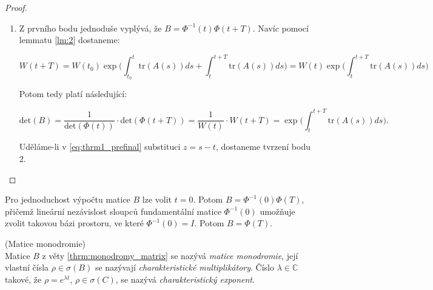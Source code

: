 \begin{thrm}
\begin{proof}
\begin{enumerate}
			\item Z prvního bodu jednoduše vyplývá, že $B = \Phi^{-1}(t) \Phi(t+T)$. Navíc pomocí lemmatu \ref{lm:2} dostaneme:
			
			\begin{equation}
				W(t+T) = W(t_{0}) \exp \Big( \int_{t_{0}}^{t} \mathrm{tr} (A(s)) ds +  \int_{t}^{t+T} \mathrm{tr} (A(s)) ds \Big) = W(t) \exp \Big( \int_{t}^{t+T} \mathrm{tr} (A(s)) ds \Big)
			\end{equation}
			
			Potom tedy platí následující: 
			
			\begin{equation}\label{eq:thrm1_prefinal}
				\mathrm{det} (B) = \frac{1}{ \mathrm{det} (\Phi(t)) } \cdot \mathrm{det} (\Phi(t+T)) = \frac{1}{W(t)} \cdot W(t+T) = \exp \Big( \int_{t}^{t+T} \mathrm{tr} (A(s)) ds \Big).
			\end{equation}
			
			Uděláme-li v \eqref{eq:thrm1_prefinal} substituci $ z = s - t $, dostaneme tvrzení bodu $2$.
		\end{enumerate}
	\end{proof}
\end{thrm}

\medskip

\begin{remark}\label{remark:monodromy_matrix_calculation}
	Pro jednoduchost výpočtu matice $B$ lze volit $t = 0$. Potom $B = \Phi^{-1}(0) \Phi(T)$, přičemž lineární nezávislost sloupců fundamentální matice $\Phi^{-1}(0)$ umožňuje zvolit takovou bázi prostoru, ve které $\Phi^{-1}(0) = I$. Potom $B = \Phi(T)$.
\end{remark}

\medskip

\begin{defn}\label{defn:monodromy_matrix} 
	(Matice monodromie) \\
	Matice $B$ z věty \ref{thrm:monodromy_matrix} se nazývá \textit{matice monodromie}, její vlastní čísla $\rho \in \sigma(B)$ se nazývají \textit{charakteristické multiplikátory}. Číslo $\lambda \in \mathbb{C}$ takové, že $\rho = e^{ \lambda t }$, $\rho \in \sigma(C)$, se nazývá \textit{charakteristický exponent}.
\end{defn}

\medskip

